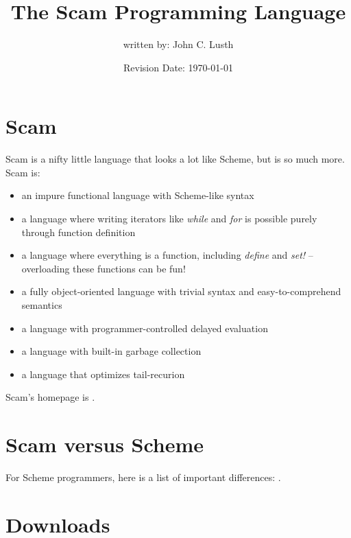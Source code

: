 \documentclass{article}
\title{The Scam Programming Language}
\author{written by: John C. Lusth}
\date{Revision Date: \today}
\begin{document}
\maketitle


\W\subsubsection{}

\W\htmlrule

\section{Scam}

Scam is a nifty little language
that looks a lot like Scheme, but is so much more.
Scam is:

\begin{itemize}
    \item
        an impure functional language with Scheme-like syntax
    \item
        a language where writing iterators like {\it while} and {\it for}
        is possible purely through function definition
    \item
        a language where everything is a function,
        including {\it define} and {\it set!}
        -- overloading these functions can be fun!
    \item
        a fully object-oriented language with trivial syntax and
        easy-to-comprehend semantics
    \item
        a language with programmer-controlled delayed
        evaluation
    \item
        a language with built-in garbage collection
    \item
        a language that optimizes tail-recurion
\end{itemize}

Scam's homepage is 
.

\section*{Scam versus Scheme}

For Scheme programmers, here is a list of important
differences: .

\section*{Downloads}
\end{document}
